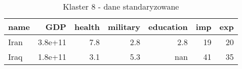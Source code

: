 \begin{table}
    \centering
    \caption{Klaster 8 - dane standaryzowane}
    \label{tab:cl8std}
    \begin{tabular}{lrrrrrr}
        \toprule
        name & GDP     & health & military & education & imp & exp \\
        \midrule
        Iran & 3.8e+11 & 7.8    & 2.8      & 2.8       & 19  & 20  \\
        Iraq & 1.8e+11 & 3.1    & 5.3      & nan       & 41  & 35  \\
        \bottomrule
    \end{tabular}
\end{table}
